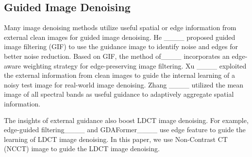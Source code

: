 \subsection{Guided Image Denoising}
\label{subsec:guided}

Many image denoising methods utilize useful spatial or edge information from external clean images for guided image denoising. He \etal____ proposed guided image filtering (GIF) to use the guidance image to identify noise and edges for better noise reduction. Based on GIF, the method of____ incorporates an edge-aware weighting strategy for edge-preserving image filtering. Xu \etal____ exploited the external information from clean images to guide the internal learning of a noisy test image for real-world image denoising. Zhang \etal____ utilized the mean image of all spectral bands as useful guidance to adaptively aggregate spatial information.

The insights of external guidance also boost LDCT image denoising. For example, edge-guided filtering____ and GDAFormer____ use edge feature to guide the learning of LDCT image denoising.
In this paper, we use Non-Contrast CT (NCCT) image to guide the LDCT image denoising.